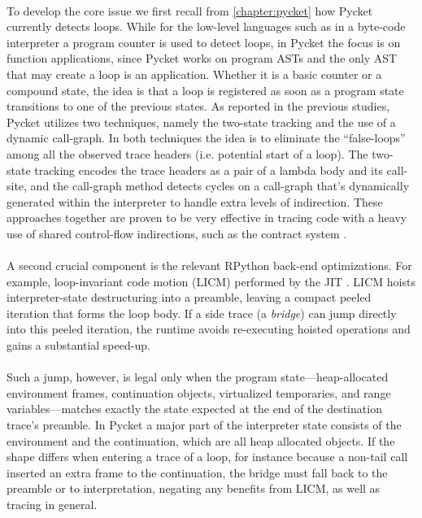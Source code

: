 	\paragraph{}%
		To develop the core issue we first recall from \ref{chapter:pycket} how Pycket currently detects loops. While for the low-level languages such as in a byte-code interpreter a program counter is used to detect loops, in Pycket the focus is on function applications, since Pycket works on program ASTs and the only AST that may create a loop is an application. Whether it is a basic counter or a compound state, the idea is that a loop is registered as soon as a program state transitions to one of the previous states. As reported in the previous studies, Pycket utilizes two techniques, namely the two-state tracking and the use of a dynamic call-graph. In both techniques the idea is to eliminate the “false-loops” among all the observed trace headers (i.e. potential start of a loop). The two-state tracking encodes the trace headers as a pair of a lambda body and its call-site, and the call-graph method detects cycles on a call-graph that's dynamically generated within the interpreter to handle extra levels of indirection. These approaches together are proven to be very effective in tracing code with a heavy use of shared control-flow indirections, such as the contract system \cite{pycketmain,pycketmain2}.

	\paragraph{}%
		A second crucial component is the relevant RPython back-end optimizations. For example, loop-invariant code motion (LICM) performed by the JIT \cite{loop-aware:12}. LICM hoists interpreter-state destructuring into a preamble, leaving a compact peeled iteration that forms the loop body. If a side trace (a \emph{bridge}) can jump directly into this peeled iteration, the runtime avoids re-executing hoisted operations and gains a substantial speed-up.

	\paragraph{}%
		Such a jump, however, is legal only when the program state—heap-allocated environment frames, continuation objects, virtualized temporaries, and range variables—matches exactly the state expected at the end of the destination trace's preamble. In Pycket a major part of the interpreter state consists of the environment and the continuation, which are all heap allocated objects. If the shape differs when entering a trace of a loop, for instance because a non-tail call inserted an extra frame to the continuation, the bridge must fall back to the preamble or to interpretation, negating any benefits from LICM, as well as tracing in general.

